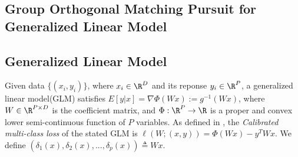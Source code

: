 

\subsection{Group Orthogonal Matching Pursuit for Generalized Linear Model}

\subsection{Generalized Linear Model}
Given data $\{(x_i, y_i)\}$, where $x_i \in \R^{D}$ and 
its reponse $y_i \in \R^{P}$, 
a generalized linear model(GLM) satisfies
$E[y | x] = \nabla\Phi(Wx) := g^{-1}(Wx)$, 
where $W \in \R^{P \times D}$ is the coefficient matrix, and $\Phi : \R^{P} \rightarrow \R$
is a proper and convex lower semi-continuous function of $P$ variables.
As defined in \cite{least_square_revisited}, the \textit{Calibrated multi-class loss} 
of the stated GLM is 
$ \ell(W ; (x, y)) = \Phi(Wx) - y^T Wx$. We define 
$(\delta_1(x), \delta_2(x), ..., \delta_p(x)) 
\triangleq  Wx$. 

